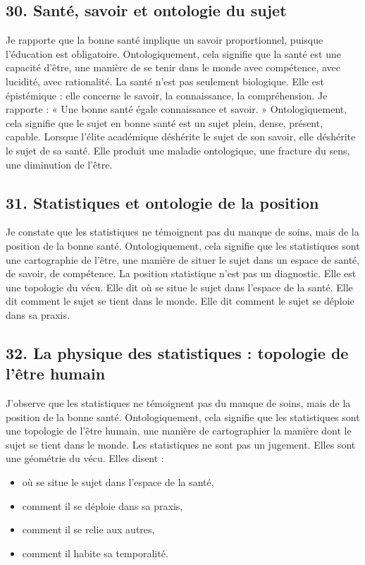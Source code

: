 \documentclass[12pt,a4paper]{article}
\begin{document}
\subsection*{30. Santé, savoir et ontologie du sujet}
Je rapporte que la bonne santé implique un savoir proportionnel, puisque l’éducation est obligatoire. Ontologiquement, cela signifie que la santé est une capacité d’être, une manière de se tenir dans le monde avec compétence, avec lucidité, avec rationalité.
La santé n’est pas seulement biologique. Elle est épistémique : elle concerne le savoir, la connaissance, la compréhension.
Je rapporte :
« Une bonne santé égale connaissance et savoir. »
Ontologiquement, cela signifie que le sujet en bonne santé est un sujet plein, dense, présent, capable.
Lorsque l’élite académique déshérite le sujet de son savoir, elle déshérite le sujet de sa santé. Elle produit une maladie ontologique, une fracture du sens, une diminution de l’être.

\subsection*{31. Statistiques et ontologie de la position}
Je constate que les statistiques ne témoignent pas du manque de soins, mais de la position de la bonne santé. Ontologiquement, cela signifie que les statistiques sont une cartographie de l’être, une manière de situer le sujet dans un espace de santé, de savoir, de compétence.
La position statistique n’est pas un diagnostic. Elle est une topologie du vécu.
Elle dit où se situe le sujet dans l’espace de la santé. Elle dit comment le sujet se tient dans le monde. Elle dit comment le sujet se déploie dans sa praxis.

\subsection*{32. La physique des statistiques : topologie de l’être humain}
J’observe que les statistiques ne témoignent pas du manque de soins, mais de la position de la bonne santé. Ontologiquement, cela signifie que les statistiques sont une topologie de l’être humain, une manière de cartographier la manière dont le sujet se tient dans le monde.
Les statistiques ne sont pas un jugement. Elles sont une géométrie du vécu.
Elles disent :
\begin{itemize}
\item où se situe le sujet dans l’espace de la santé,
\item comment il se déploie dans sa praxis,
\item comment il se relie aux autres,
\item comment il habite sa temporalité.
\end{itemize}
\end{document}
